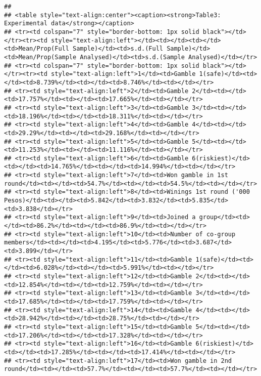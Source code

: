 \documentclass[]{tufte-handout}
\begin{document}
\begin{verbatim}
## 
## <table style="text-align:center"><caption><strong>Table3: Experimental data</strong></caption>
## <tr><td colspan="7" style="border-bottom: 1px solid black"></td></tr><tr><td style="text-align:left"></td><td></td><td></td><td>Mean/Prop(Full Sample)</td><td>s.d.(Full Sample)</td><td>Mean/Prop(Sample Analysed)</td><td>s.d.(Sample Analysed)</td></tr>
## <tr><td colspan="7" style="border-bottom: 1px solid black"></td></tr><tr><td style="text-align:left">1</td><td>Gamble 1(safe)</td><td></td><td>8.739%</td><td></td><td>8.746%</td><td></td></tr>
## <tr><td style="text-align:left">2</td><td>Gamble 2</td><td></td><td>17.757%</td><td></td><td>17.665%</td><td></td></tr>
## <tr><td style="text-align:left">3</td><td>Gamble 3</td><td></td><td>18.196%</td><td></td><td>18.311%</td><td></td></tr>
## <tr><td style="text-align:left">4</td><td>Gamble 4</td><td></td><td>29.29%</td><td></td><td>29.168%</td><td></td></tr>
## <tr><td style="text-align:left">5</td><td>Gamble 5</td><td></td><td>11.253%</td><td></td><td>11.116%</td><td></td></tr>
## <tr><td style="text-align:left">6</td><td>Gamble 6(riskiest)</td><td></td><td>14.765%</td><td></td><td>14.994%</td><td></td></tr>
## <tr><td style="text-align:left">7</td><td>Won gamble in 1st round</td><td></td><td>54.7%</td><td></td><td>54.5%</td><td></td></tr>
## <tr><td style="text-align:left">8</td><td>Winings 1st round ('000 Pesos)</td><td></td><td>5.842</td><td>3.832</td><td>5.835</td><td>3.838</td></tr>
## <tr><td style="text-align:left">9</td><td>Joined a group</td><td></td><td>86.2%</td><td></td><td>86.9%</td><td></td></tr>
## <tr><td style="text-align:left">10</td><td>Number of co-group members</td><td></td><td>4.195</td><td>5.776</td><td>3.687</td><td>3.899</td></tr>
## <tr><td style="text-align:left">11</td><td>Gamble 1(safe)</td><td></td><td>6.028%</td><td></td><td>5.991%</td><td></td></tr>
## <tr><td style="text-align:left">12</td><td>Gamble 2</td><td></td><td>12.854%</td><td></td><td>12.759%</td><td></td></tr>
## <tr><td style="text-align:left">13</td><td>Gamble 3</td><td></td><td>17.685%</td><td></td><td>17.759%</td><td></td></tr>
## <tr><td style="text-align:left">14</td><td>Gamble 4</td><td></td><td>28.942%</td><td></td><td>28.75%</td><td></td></tr>
## <tr><td style="text-align:left">15</td><td>Gamble 5</td><td></td><td>17.206%</td><td></td><td>17.328%</td><td></td></tr>
## <tr><td style="text-align:left">16</td><td>Gamble 6(riskiest)</td><td></td><td>17.285%</td><td></td><td>17.414%</td><td></td></tr>
## <tr><td style="text-align:left">17</td><td>Won gamble in 2nd round</td><td></td><td>57.7%</td><td></td><td>57.7%</td><td></td></tr>

\end{verbatim}
\end{document}
